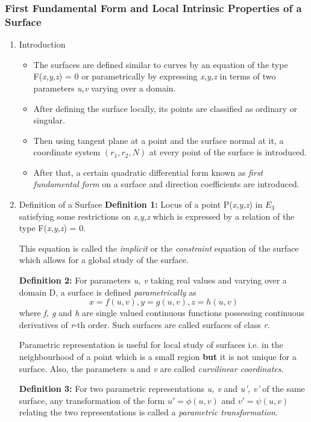 \documentclass[11pt]{article}
\begin{document}
\subsubsection{First Fundamental Form and Local Intrinsic Properties of a Surface}
\label{sec:org85f63b3}
\begin{enumerate}
\item Introduction
\label{sec:org5146791}
\begin{itemize}
\item The surfaces are defined similar to curves by an equation of the type F(\emph{x,y,z}) = 0 or parametrically by expressing \emph{x,y,z} in terms of two parameters \emph{u,v} varying over a domain.
\item After defining the surface locally, its points are classified as ordinary or singular.
\item Then using tangent plane at a point and the surface normal at it, a coordinate system \textbf{\((r_1, r_2, N)\)} at every point of the surface is introduced.
\item After that, a certain quadratic differential form known as \emph{first fundamental form} on a surface and direction coefficients are introduced.
\end{itemize}
\item Definition of a Surface
\label{sec:orgacdc178}
\textbf{Definition 1:} Locus of a point P(\emph{x,y,z}) in \(E_{3}\) satisfying some restrictions on \emph{x,y,z} which is expressed by a relation of the type F(\emph{x,y,z}) = 0.

This equation is called the \emph{implicit} or the \emph{constraint} equation of the surface which allows for a global study of the surface.

\textbf{Definition 2:} For parameters \emph{u, v} taking real values and varying over a domain D, a surface is defined \emph{parametrically} as
  \[
      x = f(u,v), y = g(u,v), z = h(u,v)
  \]
  where \emph{f, g} and \emph{h} are single valued continuous functions possessing continuous derivatives of \emph{r}-th order. Such surfaces are called surfaces of class \emph{r}.

Parametric representation is useful for local study of surfaces i.e. in the neighbourhood of a point which is a small region \textbf{but} it is not unique for a surface. Also, the parameters \emph{u} and \emph{v} are called \emph{curvilinear coordinates}.

\textbf{Definition 3:} For two parametric representations \emph{u, v} and \emph{u', v'} of the same surface, any transformation of the form \(u'=\phi(u,v)\) and \(v'=\psi(u,v)\) relating the two representations is called a \emph{parametric transformation}.


\end{enumerate}
\end{document}
